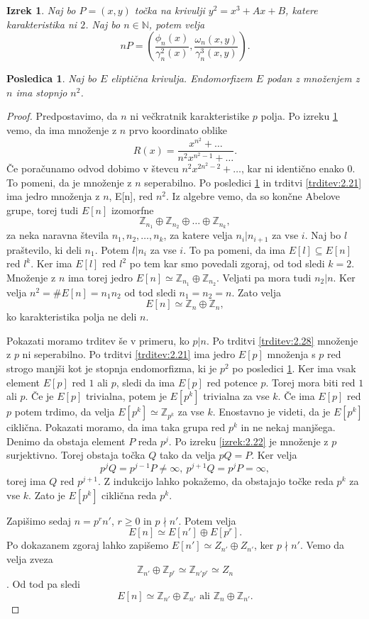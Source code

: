 \documentclass[12pt,a4paper,twoside]{article}
\theoremstyle{definition} %
\theoremstyle{plain} %
\newtheorem{izrek}[definicija]{Izrek}
\newtheorem{posledica}[definicija]{Posledica}
\numberwithin{equation}{section}  %
\newcommand{\N}{\mathbb N}
\newcommand{\Z}{\mathbb Z}
\begin{document}
\begin{izrek}
\label{izrek:3.6}
Naj bo $P = (x,y)$ točka na krivulji $y^2 = x^3+Ax+B$, katere karakteristika ni $2$. Naj bo $n\in \N$, potem velja
$$nP = \left( \frac{\phi_n(x)}{\gamma^2_n(x)}, \frac{\omega_n(x,y)}{\gamma^3_n(x,y)}\right).$$


\end{izrek}

\begin{posledica}
\label{posledica:3.7}
Naj bo $E$ eliptična krivulja. Endomorfizem $E$ podan z množenjem z $n$ ima stopnjo $n^2$.
\end{posledica}


\begin{proof}
Predpostavimo, da $n$ ni večkratnik karakteristike $p$ polja. Po izreku \ref{izrek:3.6} vemo, da ima množenje z $n$ prvo koordinato oblike
$$R(x) = \frac{x^{n^2}+\ldots}{n^2x^{n^2-1}+ \ldots}.$$
Če poračunamo odvod dobimo v števcu $n^2x^{2n^2-2}+ \ldots$, kar ni identično enako $0$. To pomeni, da je množenje z $n$ seperabilno. Po posledici \ref{posledica:3.7} in trditvi \ref{trditev:2.21} ima jedro množenja z $n$, E[n], red $n^2$. Iz algebre vemo, da so končne Abelove grupe, torej tudi  $E[n]$ izomorfne
$$\Z_{n_1} \oplus \Z_{n_2} \oplus \ldots \oplus \Z_{n_k},$$
za neka naravna števila $n_1,n_2,\ldots,n_k$, za katere velja $n_i|n_{i+1}$  za vse $i$. Naj bo $l$ praštevilo, ki deli $n_1$. Potem $l|n_i$ za vse $i$. To pa pomeni, da ima $E[l] \subseteq E[n]$ red $l^k$. Ker ima $E[l]$ red $l^2$ po tem kar smo povedali zgoraj, od tod sledi $k=2$. Množenje z $n$ ima torej jedro $E[n] \simeq \Z_{n_1} \oplus \Z_{n_2}$. Veljati pa mora tudi $n_2|n$. Ker velja $n^2=\#E[n] = n_1n_2$ od tod sledi $n_1=n_2=n$. Zato velja
$$E[n] \simeq \Z_n \oplus \Z_n,$$
ko karakteristika polja ne deli $n$.

Pokazati moramo trditev še v primeru, ko $p|n$. Po trditvi \ref{trditev:2.28} množenje z $p$ ni seperabilno. Po trditvi \ref{trditev:2.21} ima jedro $E[p]$ množenja s $p$ red strogo manjši kot je stopnja endomorfizma, ki je $p^2$ po posledici \ref{posledica:3.7}. Ker ima vsak element $E[p]$ red $1$ ali $p$, sledi da ima $E[p]$ red potence $p$. Torej mora biti red $1$ ali $p$. Če je $E[p]$ trivialna, potem je $E[p^k]$ trivialna za vse $k$. Če ima $E[p]$ red $p$ potem trdimo, da velja $E[p^k] \simeq \Z_{p ^k}$ za vse $k$. Enostavno je videti, da je $E[p^k]$ ciklična. Pokazati moramo, da ima taka grupa red $p^k$ in ne nekaj manjšega. Denimo da obstaja element $P$ reda $p^j$. Po izreku \ref{izrek:2.22} je množenje z $p$ surjektivno. Torej obstaja točka $Q$ tako da velja $pQ = P$. Ker velja
$$p^jQ = p^{j-1}P \neq \infty, \ p^{j+1}Q = p^jP = \infty,$$
torej ima $Q$ red $p^{j+1}$. Z indukcijo lahko pokažemo, da obstajajo točke reda $p^k$ za vse $k$. Zato je $E[p^k]$ ciklična reda $p^k$.

Zapišimo sedaj $n=p^rn'$, $r\geq0$ in $p\nmid n'$. Potem velja
$$E[n] \simeq E[n'] \oplus E[p^r].$$
Po dokazanem zgoraj lahko zapišemo $E[n'] \simeq Z_{n'} \oplus Z_{n'}$, ker $p \nmid n'$. Vemo da velja zveza
$$\Z_{n'} \oplus \Z_{p^r} \simeq \Z_{n'p^r} \simeq Z_n$$.
Od tod pa sledi
$$E[n] \simeq \Z_{n'} \oplus \Z_{n'} \text{ ali } \Z_n \oplus \Z_{n'}.$$
\end{proof}
\end{document}
